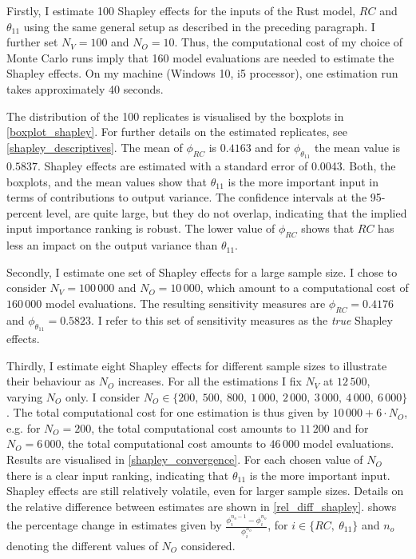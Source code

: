 Firstly, I estimate 100 Shapley effects for the inputs of the Rust model, $RC$ and $\theta_{11}$ using the same general setup as described in the preceding paragraph. I further set $N_V=100$ and $N_O=10$. Thus, the computational cost of my choice of Monte Carlo runs imply that 160 model evaluations are needed to estimate the Shapley effects. On my machine (Windows 10, i5 processor), one estimation run takes approximately 40 seconds.

The distribution of the 100 replicates is visualised by the boxplots in \cref{boxplot_shapley}. For further details on the estimated replicates, see \cref{shapley_descriptives}. The mean of $\phi_{RC}$ is $0.4163$ and for $\phi_{\theta_{11}}$ the mean value is $0.5837$. Shapley effects are estimated with a standard error of 0.0043.
Both, the boxplots, and the mean values show that $\theta_{11}$ is the more important input in terms of contributions to output variance. The confidence intervals at the 95-percent level, are quite large, but they do not overlap, indicating that the implied input importance ranking is robust. The lower value of $\phi_{RC}$ shows that $RC$ has less an impact on the output variance than $\theta_{11}$.


Secondly, I estimate one set of Shapley effects for a large sample size. I chose to consider $N_V=100\,000$ and $N_O=10\,000$, which amount to a computational cost of $160\,000$ model evaluations. The resulting sensitivity measures are $\phi_{RC} = 0.4176$ and $\phi_{\theta_{11}} = 0.5823$. I refer to this set of sensitivity measures as the \textit{true} Shapley effects.


Thirdly, I estimate eight Shapley effects for different sample sizes to illustrate their behaviour as $N_O$ increases. For all the estimations I fix $N_V$ at $12\,500$, varying $N_O$ only. I consider $N_O \in \{200,\ 500,\ 800,\ 1\,000,\ 2\,000,\ 3\,000,\ 4\,000,\ 6\,000 \}$. The total computational cost for one estimation is thus given by $10\,000 + 6 \cdot N_O$, e.g. for $N_O=200$, the total computational cost amounts to $11\,200$ and for $N_O=6\,000$, the total computational cost amounts to $46\,000$ model evaluations. Results are visualised in \cref{shapley_convergence}. For each chosen value of $N_O$ there is a clear input ranking, indicating that $\theta_{11}$ is the more important input. Shapley effects are still relatively volatile, even for larger sample sizes. Details on the relative difference between estimates are shown in \cref{rel_diff_shapley}.  shows the percentage change in estimates given by $\frac{\phi_i^{n_o-1} - \phi_i^{n_o}}{\phi_i^{n_o}}$, for $i \in \{RC,\ \theta_{11}\}$ and $n_o$ denoting the different values of $N_O$ considered. %

